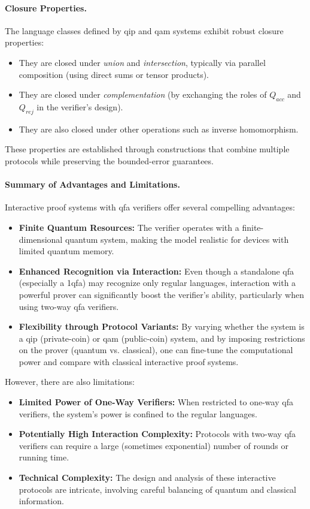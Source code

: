\paragraph{Closure Properties.}
The language classes defined by \gls{qip} and \gls{qam} systems exhibit robust closure properties:
\begin{itemize}
  \item They are closed under \emph{union} and \emph{intersection}, typically via parallel composition (using direct sums or tensor products).
  \item They are closed under \emph{complementation} (by exchanging the roles of $Q_{acc}$ and $Q_{rej}$ in the verifier’s design).
  \item They are also closed under other operations such as inverse homomorphism.
\end{itemize}
These properties are established through constructions that combine multiple protocols while preserving the bounded-error guarantees.

\paragraph{Summary of Advantages and Limitations.}
Interactive proof systems with qfa verifiers offer several compelling advantages:
\begin{itemize}
  \item \textbf{Finite Quantum Resources:} The verifier operates with a finite-dimensional quantum system, making the model realistic for devices with limited quantum memory.
  \item \textbf{Enhanced Recognition via Interaction:} Even though a standalone qfa (especially a 1qfa) may recognize only regular languages, interaction with a powerful prover can significantly boost the verifier’s ability, particularly when using two-way qfa verifiers.
  \item \textbf{Flexibility through Protocol Variants:} By varying whether the system is a \gls{qip} (private-coin) or \gls{qam} (public-coin) system, and by imposing restrictions on the prover (quantum vs. classical), one can fine-tune the computational power and compare with classical interactive proof systems.
\end{itemize}
However, there are also limitations:
\begin{itemize}
  \item \textbf{Limited Power of One-Way Verifiers:} When restricted to one-way qfa verifiers, the system’s power is confined to the regular languages.
  \item \textbf{Potentially High Interaction Complexity:} Protocols with two-way qfa verifiers can require a large (sometimes exponential) number of rounds or running time.
  \item \textbf{Technical Complexity:} The design and analysis of these interactive protocols are intricate, involving careful balancing of quantum and classical information.
\end{itemize}

